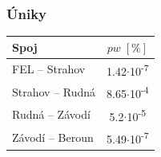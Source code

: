 \documentclass[aspectratio=169, 12pt, hyperref={unicode}]{beamer}
\begin{document}
\begin{frame}
\frametitle{Úniky}
\begin{table}[ht]
		\centering	
		\begin{tabular}[t]{|l||c|}
			\hline
			Spoj & $pw \; [\text{\%}]$\\
			\hline\hline
			FEL -- Strahov & 1.42$\cdot$10\textsuperscript{-7}\\  
			\hline
			Strahov -- Rudná & 8.65$\cdot$10\textsuperscript{-4}\\
			\hline
			Rudná -- Závodí & 5.2$\cdot$10\textsuperscript{-5} \\
			\hline
			Závodí -- Beroun & 5.49$\cdot$10\textsuperscript{-7} \\
			\hline
		\end{tabular}
	\end{table}
\end{frame}


\end{document}
